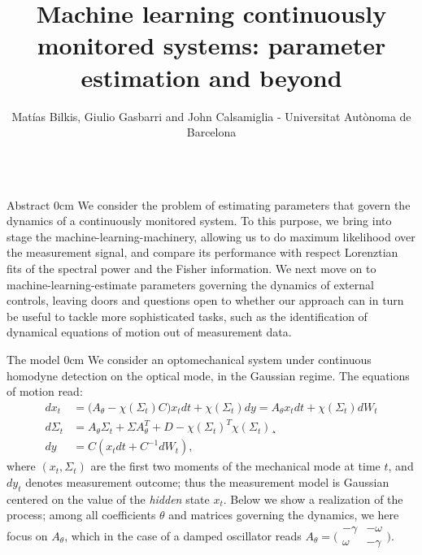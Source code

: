 \documentclass[xcolor={table}]{beamer}
\title{{\large Machine learning continuously monitored systems: parameter estimation and beyond}}
\author{ {\normalsize Matías Bilkis, Giulio Gasbarri and John Calsamiglia  - Universitat Autònoma de Barcelona}}
\institute{}%
\begin{document}
\begin{frame}[fragile=singleslide,t]\centering

\maketitle

\begin{columns}[onlytextwidth,T]

\begin{column}{.47\textwidth}

\begin{block}{Abstract}
   0cm \dimexpr\linewidth-0cm\relax
  We consider the problem of estimating parameters that govern the dynamics of a continuously monitored system. To this purpose, we bring into stage the machine-learning-machinery, allowing us to do maximum likelihood over the measurement signal, and compare its performance with respect Lorenztian fits of the spectral power and the Fisher information. We next move on to machine-learning-estimate parameters governing the dynamics of external controls, leaving doors and questions open to whether our approach can in turn be useful to tackle more sophisticated tasks, such as the identification of dynamical equations of motion out of measurement data.
\end{block}

\begin{block}{The model}
   0cm \dimexpr\linewidth-0cm\relax
We consider an optomechanical system under continuous homodyne detection on the optical mode, in the Gaussian regime. The equations of motion read:
\begin{align}\label{eq:evo}
dx_t &= \big(A_\theta - \chi(\Sigma_t) C\big) x_t dt + \chi(\Sigma_t) dy = A_\theta x_t dt + \chi(\Sigma_t) dW_t \\
d\Sigma_t &= A_\theta \Sigma_t + \Sigma A_\theta^T + D - \chi(\Sigma_t)^T \chi(\Sigma_t) \nonumber¸\\
dy &= C(x_tdt + C^{-1}dW_t), \nonumber
\end{align}
where $(x_t,\Sigma_t)$ are the first two moments of the mechanical mode at time $t$, and $dy_t$ denotes measurement outcome; thus the measurement model is Gaussian centered on the value of the \textit{hidden} state $x_t$. Below we show a realization of the process; among all coefficients $\theta$ and matrices governing the dynamics, we here focus on $A_\theta$, which in the case of a damped oscillator reads {\small$A_{\theta} = \Big(\begin{matrix}-\gamma& -\omega\\\omega & -\gamma\end{matrix}\Big)$}.


\end{block}
\end{column}
\end{columns}
\end{frame}
\end{document}
